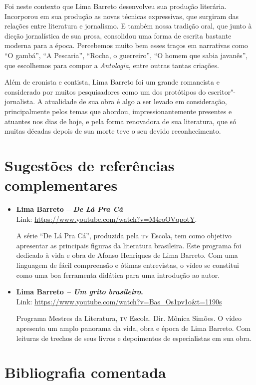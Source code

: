 \documentclass[11pt]{extarticle}
\begin{document}
Foi neste contexto que Lima Barreto desenvolveu sua produção literária.
Incorporou em sua produção as novas técnicas expressivas, que surgiram
das relações entre literatura e jornalismo. E também nossa tradição
oral, que junto à dicção jornalística de sua prosa, consolidou uma forma
de escrita bastante moderna para a época. Percebemos muito bem esses
traços em narrativas como ``O gambá'', ``A
Pescaria'', ``Rocha, o guerreiro'', ``O homem
que sabia javanês'', que escolhemos para compor a \emph{Antologia},
entre outras tantas criações.

Além de cronista e contista, Lima Barreto foi um grande romancista e
considerado por muitos pesquisadores como um dos protótipos do
escritor"-jornalista. A atualidade de sua obra é algo a ser levado em
consideração, principalmente pelos temas que abordou,
impressionantemente presentes e atuantes nos dias de hoje, e pela forma
renovadora de sua literatura, que só muitas décadas depois de sua morte
teve o seu devido reconhecimento.

\section{Sugestões de referências complementares}\label{sugestoes}

\begin{itemize}
\item \textbf{Lima Barreto -- \emph{De Lá Pra Cá} }\\
Link: \url{https://www.youtube.com/watch?v=M4roOVqpotY}.

A série ``De Lá Pra Cá'', produzida pela \textsc{tv} Escola, tem como objetivo
apresentar as principais figuras da literatura brasileira. Este programa
foi dedicado à vida e obra de Afonso Henriques de Lima Barreto. Com uma
linguagem de fácil compreensão e ótimas entrevistas, o vídeo se
constitui como uma boa ferramenta didática para uma introdução ao autor.

\item \textbf{Lima Barreto \emph{-- Um grito brasileiro}. }\\
Link: \url{https://www.youtube.com/watch?v=Bas_Os1pv1o\&t=1190s}

Programa Mestres da Literatura, \textsc{tv} Escola. Dir. Mônica Simões. O vídeo
apresenta um amplo panorama da vida, obra e época de Lima Barreto. Com
leituras de trechos de seus livros e depoimentos de especialistas em sua
obra.
\end{itemize}


\section{Bibliografia comentada}
\end{document}
